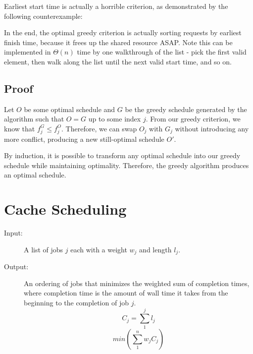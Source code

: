 \documentclass[11pt]{article}
\begin{document}
		Earliest start time is actually a horrible criterion, as demonstrated by the following counterexample:
		
		\begin{center}
		\end{center}
		
		In the end, the optimal greedy criterion is actually sorting requests by earliest finish time, because it frees up the shared resource ASAP. Note this can be implemented in $\Theta(n)$ time by one walkthrough of the list - pick the first valid element, then walk along the list until the next valid start time, and so on.
		
	\subsection{Proof}
		Let $O$ be some optimal schedule and $G$ be the greedy schedule generated by the algorithm such that $O = G$ up to some index $j$. From our greedy criterion, we know that $f_j^G \leq f_j^O$. Therefore, we can swap $O_j$ with $G_j$ without introducing any more conflict, producing a new still-optimal schedule $O'$.
		
		By induction, it is possible to transform any optimal schedule into our greedy schedule while maintaining optimality. Therefore, the greedy algorithm produces an optimal schedule.

\section{Cache Scheduling}
	\begin{description}
		\item[Input:] A list of jobs $j$ each with a weight $w_j$ and length $l_j$.
		\item[Output:] An ordering of jobs that minimizes the weighted sum of completion times, where completion time is the amount of wall time it takes from the beginning to the completion of job $j$.
		\[C_j = \sum_1^j l_j\]
		\[min(\sum_1^nw_jC_j)\]
	\end{description}
	
\end{document}
